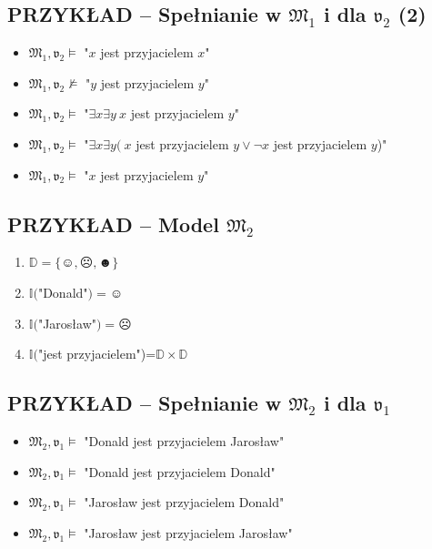 \documentclass[12pt]{article}
\begin{document}
\subsection{PRZYKŁAD -- Spełnianie w $\mathfrak{M}_1$ i dla $\mathfrak{v}_2$ (2)}
%
\begin{itemize}
\item $\mathfrak{M}_1,\mathfrak{v}_2 \vDash$ "$x$ jest przyjacielem $x$"%
\item $\mathfrak{M}_1,\mathfrak{v}_2 \not \vDash$ "$y$ jest przyjacielem $y$"%
\item $\mathfrak{M}_1,\mathfrak{v}_2 \vDash$ "$\exists x \exists y ~x$ jest przyjacielem $y$"%
\item $\mathfrak{M}_1,\mathfrak{v}_2 \vDash$ "$\exists x \exists y ( ~x$ jest przyjacielem $y \lor \neg x$ jest przyjacielem $y$)"%
\item $\mathfrak{M}_1,\mathfrak{v}_2 \vDash$ "$x$ jest przyjacielem $y$"
\end{itemize}
%

\subsection{PRZYKŁAD -- Model $\mathfrak{M}_2$}
%
\begin{enumerate}
    \item $\mathbb{D} = \{\smiley{}, \frownie{}, \blacksmiley{} \}$%
    \item $\mathbb{I}($"Donald"$)=\smiley{}$%
    \item $\mathbb{I}($"Jarosław"$)=\frownie{}$%
    \item $\mathbb{I}($"jest przyjacielem")=$\mathbb{D} \times \mathbb{D}$
\end{enumerate}
%

\subsection{PRZYKŁAD -- Spełnianie w $\mathfrak{M}_2$ i dla $\mathfrak{v}_1$}
%
\begin{itemize}
\item $\mathfrak{M}_2,\mathfrak{v}_1 \vDash$ "Donald jest przyjacielem Jarosław"%
\item $\mathfrak{M}_2,\mathfrak{v}_1 \vDash$ "Donald jest przyjacielem Donald"%
\item $\mathfrak{M}_2,\mathfrak{v}_1 \vDash$ "Jarosław jest przyjacielem Donald"%
\item $\mathfrak{M}_2,\mathfrak{v}_1 \vDash$ "Jarosław jest przyjacielem Jarosław"
\end{itemize}
%
\end{document}
